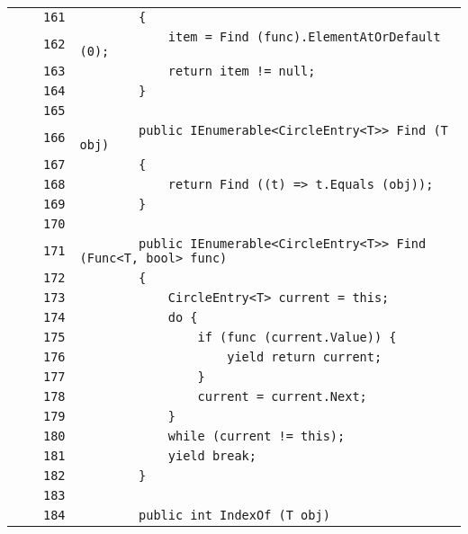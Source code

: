 \documentclass[a4paper,10pt]{article}
\begin{document}
\begin{longtable}[l]{lrrl}
\cellcolor{gray} &  & \verb~161~ & \verb~        {~\\
\cellcolor{gray} &  & \verb~162~ & \verb~            item = Find (func).ElementAtOrDefault (0);~\\
\cellcolor{gray} &  & \verb~163~ & \verb~            return item != null;~\\
\cellcolor{gray} &  & \verb~164~ & \verb~        }~\\
\cellcolor{gray} &  & \verb~165~ & \verb~~\\
\cellcolor{gray} &  & \verb~166~ & \verb~        public IEnumerable<CircleEntry<T>> Find (T obj)~\\
\cellcolor{gray} &  & \verb~167~ & \verb~        {~\\
\cellcolor{gray} &  & \verb~168~ & \verb~            return Find ((t) => t.Equals (obj));~\\
\cellcolor{gray} &  & \verb~169~ & \verb~        }~\\
\cellcolor{gray} &  & \verb~170~ & \verb~~\\
\cellcolor{gray} &  & \verb~171~ & \verb~        public IEnumerable<CircleEntry<T>> Find (Func<T, bool> func)~\\
\cellcolor{gray} &  & \verb~172~ & \verb~        {~\\
\cellcolor{gray} &  & \verb~173~ & \verb~            CircleEntry<T> current = this;~\\
\cellcolor{gray} &  & \verb~174~ & \verb~            do {~\\
\cellcolor{gray} &  & \verb~175~ & \verb~                if (func (current.Value)) {~\\
\cellcolor{gray} &  & \verb~176~ & \verb~                    yield return current;~\\
\cellcolor{gray} &  & \verb~177~ & \verb~                }~\\
\cellcolor{gray} &  & \verb~178~ & \verb~                current = current.Next;~\\
\cellcolor{gray} &  & \verb~179~ & \verb~            }~\\
\cellcolor{gray} &  & \verb~180~ & \verb~            while (current != this);~\\
\cellcolor{gray} &  & \verb~181~ & \verb~            yield break;~\\
\cellcolor{gray} &  & \verb~182~ & \verb~        }~\\
\cellcolor{gray} &  & \verb~183~ & \verb~~\\
\cellcolor{gray} &  & \verb~184~ & \verb~        public int IndexOf (T obj)~\\

\end{longtable}
\end{document}
